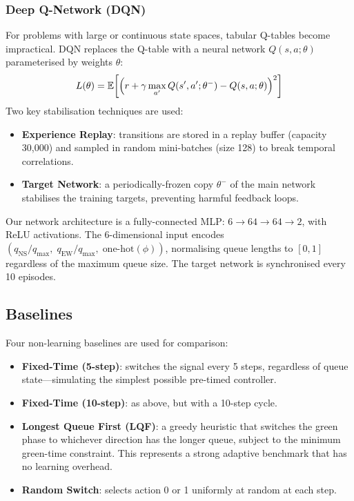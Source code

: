 \documentclass[12pt]{article}
\begin{document}
\subsubsection{Deep Q-Network (DQN)}
For problems with large or continuous state spaces, tabular Q-tables become
impractical. DQN \cite{mnih2015} replaces the Q-table with a neural network
$Q(s,a;\theta)$ parameterised by weights $\theta$:
\[
    L(\theta) = \mathbb{E}\!\left[\Bigl(r + \gamma\max_{a'}Q(s',a';\theta^-) - Q(s,a;\theta)\Bigr)^2\right]
\]
Two key stabilisation techniques are used:
\begin{itemize}[noitemsep]
    \item \textbf{Experience Replay}: transitions are stored in a replay buffer
          (capacity 30{,}000) and sampled in random mini-batches (size 128) to break
          temporal correlations.
    \item \textbf{Target Network}: a periodically-frozen copy $\theta^-$ of the main
          network stabilises the training targets, preventing harmful feedback loops.
\end{itemize}

Our network architecture is a fully-connected MLP: $6 \to 64 \to 64 \to 2$, with ReLU
activations. The 6-dimensional input encodes $(q_\text{NS}/q_\text{max},\;
q_\text{EW}/q_\text{max},\; \text{one-hot}(\phi))$, normalising queue lengths to
$[0,1]$ regardless of the maximum queue size. The target network is synchronised every
10 episodes.

\subsection{Baselines}
Four non-learning baselines are used for comparison:
\begin{itemize}[noitemsep]
    \item \textbf{Fixed-Time (5-step)}: switches the signal every 5 steps, regardless
          of queue state---simulating the simplest possible pre-timed controller.
    \item \textbf{Fixed-Time (10-step)}: as above, but with a 10-step cycle.
    \item \textbf{Longest Queue First (LQF)}: a greedy heuristic that switches the
          green phase to whichever direction has the longer queue, subject to the
          minimum green-time constraint. This represents a strong adaptive benchmark
          that has no learning overhead.
    \item \textbf{Random Switch}: selects action 0 or 1 uniformly at random at each
          step.
\end{itemize}
\end{document}

